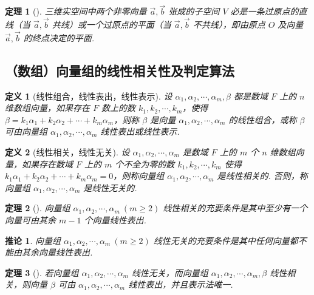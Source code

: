 \documentclass[zihao=-4,UTF8,linespread=1.8,nothm]{aytony_base}
\newtheorem{theorem}{\indent 定理}[subsection]
\newtheorem*{corollary}{\indent 推论}
\newtheorem{definition}{\indent 定义}[subsection]
\begin{document}
\begin{theorem}[]
    三维实空间中两个非零向量 $\vec{a}, \vec{b}$ 张成的子空间 $V$ 必是一条过原点的直线（当 $\vec{a}, \vec{b}$ 共线）或一个过原点的平面（当 $\vec{a}, \vec{b}$ 不共线），即由原点 $O$ 及向量 $\vec{a}, \vec{b}$ 的终点决定的平面.
\end{theorem}

\subsection{（数组）向量组的线性相关性及判定算法}

\begin{definition}[线性组合，线性表出，线性表示]
    设 $\alpha_1, \alpha_2, \cdots, \alpha_m, \beta$ 都是数域 $F$ 上的 $n$ 维数组向量，如果存在 $F$ 数上的数 $k_1, k_2, \cdots, k_m$，使得 $\beta = k_1\alpha_1 + k_2\alpha_2 + \cdots + k_m\alpha_m$，则称 $\beta$ 是向量 $\alpha_1, \alpha_2, \cdots, \alpha_m$ 的线性组合，或称 $\beta$ 可由向量组 $\alpha_1, \alpha_2, \cdots, \alpha_m $ 线性表出或线性表示.
\end{definition}

\begin{definition}[线性相关，线性无关]
    设 $\alpha_1, \alpha_2, \cdots, \alpha_m$ 是数域 $F$ 上的 $m$ 个 $n$ 维数组向量，如果存在数域 $F$ 上的 $m$ 个不全为零的数 $k_1, k_2, \cdots, k_m$ 使得 $k_1 \alpha_1 + k_2 \alpha_2 + \cdots + k_m \alpha_m = 0$，则称向量组 $\alpha_1, \alpha_2, \cdots, \alpha_m$ 是线性相关的. 否则，称向量组 $\alpha_1, \alpha_2, \cdots, \alpha_m$ 是线性无关的.
\end{definition}

\begin{theorem}[]
    向量组 $\alpha_1, \alpha_2, \cdots, \alpha_m\ (m \geqslant 2)$ 线性相关的充要条件是其中至少有一个向量可由其余 $m-1$ 个向量线性表出.
\end{theorem}

\begin{corollary}
    向量组 $\alpha_1, \alpha_2, \cdots, \alpha_m\ (m \geqslant 2)$ 线性无关的充要条件是其中任何向量都不能由其余向量线性表出.
\end{corollary}

\begin{theorem}[]
    若向量组 $\alpha_1, \alpha_2, \cdots, \alpha_m$ 线性无关，而向量组 $\alpha_1, \alpha_2, \cdots, \alpha_m, \beta$ 线性相关，则向量 $\beta$ 可由 $\alpha_1, \alpha_2, \cdots, \alpha_m$ 线性表出，并且表示法唯一.
\end{theorem}
\end{document}
